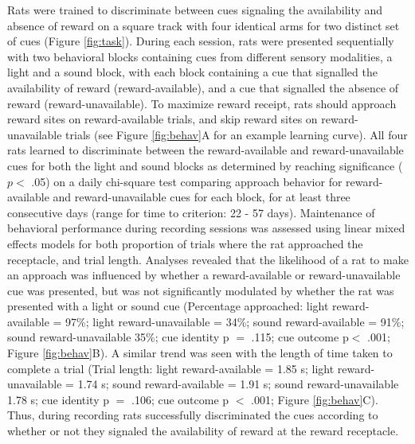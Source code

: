 \documentclass[11pt]{article}
\begin{document}
Rats were trained to discriminate between cues signaling the
availability and absence of reward on a square track with four
identical arms for two distinct set of cues (Figure
\ref{fig:task}). During each session, rats were presented sequentially
with two behavioral blocks containing cues from different sensory
modalities, a light and a sound block, with each block containing a
cue that signalled the availability of reward (reward-available), and
a cue that signalled the absence of reward (reward-unavailable). To
maximize reward receipt, rats should approach reward sites on
reward-available trials, and skip reward sites on reward-unavailable
trials (see Figure \ref{fig:behav}A for an example learning
curve). All four rats learned to discriminate between the
reward-available and reward-unavailable cues for both the light and
sound blocks as determined by reaching significance ($p <$ .05) on a
daily chi-square test comparing approach behavior for reward-available
and reward-unavailable cues for each block, for at least three
consecutive days (range for time to criterion: 22 - 57
days). Maintenance of behavioral performance during recording sessions
was assessed using linear mixed effects models for both proportion of
trials where the rat approached the receptacle, and trial
length. Analyses revealed that the likelihood of a rat to make an
approach was influenced by whether a reward-available or
reward-unavailable cue was presented, but was not significantly
modulated by whether the rat was presented with a light or sound cue
(Percentage approached: light reward-available = 97\%; light
reward-unavailable = 34\%; sound reward-available = 91\%; sound
reward-unavailable 35\%; cue identity p $=$ .115; cue outcome p$<$
.001; Figure \ref{fig:behav}B). A similar trend was seen with the
length of time taken to complete a trial (Trial length: light
reward-available = 1.85 s; light reward-unavailable = 1.74 s; sound
reward-available = 1.91 s; sound reward-unavailable 1.78 s; cue
identity p $=$ .106; cue outcome p $<$ .001; Figure
\ref{fig:behav}C). Thus, during recording rats successfully
discriminated the cues according to whether or not they signaled the
availability of reward at the reward receptacle.
\end{document}
